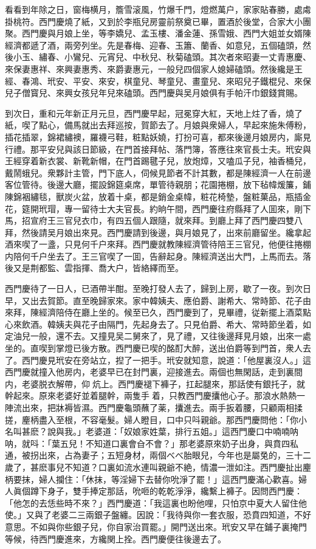 看看到年除之日，窗梅横月，簷雪滚風，竹爆千門，燈燃萬户，家家貼春勝，處䖏掛桃符。西門慶燒了紙，又到於李瓶兒房靈前祭奠已畢，置酒於後堂，合家大小團聚。西門慶與月娘上坐，等李嬌兒、孟玉樓、潘金蓮、孫雪娥、西門大姐並女婿陳經濟都遞了酒，兩旁列坐。先是春梅、迎春、玉簫、蘭香、如意兒，五個磕頭，然後小玉、繡春、小鸞兒、元宵兒、中秋兒、秋菊磕頭。其次者來昭妻一丈青惠慶、來保妻惠祥、來興妻惠秀、來爵妻惠元，一般兒四個家人媳婦磕頭。然後纔是王經、春鴻、玳安、平安、來安，棋童兒、琴童兒、畫童兒、來昭兒子鐵棍兒、來保兒子僧寳兒、來興女孩兒年兒來磕頭。西門慶與吴月娘俱有手帕汗巾銀錢賞賜。

到次日，重和元年新正月元旦，西門慶早起，冠冕穿大紅，天地上炷了香，燒了紙，喫了點心，備馬就出去拜巡按，賀節去了。月娘與衆婦人，早起來施朱傅粉，插花插翠，錦裙繡襖，羅襪弓鞋，粧點妖嬈，打扮可喜，都來後邊月娘房内，廝見行禮。那平安兒與該日節級，在門首接拜帖、落門簿，答應往來官長士夫。玳安與王經穿着新衣裳、新靴新帽，在門首踢毽子兒，放炮𤍤，又嗑瓜子兒，袖香桶兒，戴鬧蛾兒。衆夥計主管，門下底人，伺候見節者不計其數，都是陳經濟一人在前邊客位管待。後邊大廳，擺設錦筵桌席，單管待親朋；花園捲棚，放下毡幃煖簾，鋪陳錦裀繡毯，獸炭火盆，放着十桌，都是銷金桌幃，粧花椅墊，盤粧菓品，瓶插金花，筵開玳瑁，專一留待士大夫官長。約晌午間，西門慶往府縣拜了人囬來，剛下馬，招宣府王三官兒衣巾，有四五個人跟隨，就來拜。到廳上拜了西門慶四雙八拜，然後請吴月娘出來見。西門慶請到後邊，與月娘見了，出來前廳留坐。纔拿起酒來喫了一盞，只見何千户來拜。西門慶就教陳經濟管待陪王三官兒，他便往捲棚内陪何千户坐去了。王三官喫了一囬，告辭起身。陳經濟送出大門，上馬而去。落後又是荆都監、雲指揮、喬大户，皆絡繹而至。

西門慶待了一日人，已酒帶半酣。至晚打發人去了，歸到上房，歇了一夜。到次日早，又出去賀節。直至晚歸家來。家中韓姨夫、應伯爵、謝希大、常時節、花子由來拜，陳經濟陪侍在廳上坐的。候至已久，西門慶到了，見畢禮，従新擺上酒菜點心來飲酒。韓姨夫與花子由隔門，先起身去了。只見伯爵、希大、常時節坐着，如定油兒一般，還不去。又撞見吴二舅來了，見了禮，又往後邊拜見月娘，出來一處坐的。直喫到掌燈已後方散。西門慶已喫的酩酊大醉，送出伯爵等到門首，衆人去了。西門慶見玳安在旁站立，揑了一把手。玳安就知意，說道：「他屋裏沒人。」這西門慶就撞入他房内，老婆早已在封門裏，迎接進去。兩個也無閑話，走到裏間内，老婆脱衣解帶，仰𢵞炕上。西門慶褪下褲子，扛起腿來，那話使有銀托子，就幹起來。原來老婆好並着腿幹，兩隻手𢵞着，只教西門慶攮他心子。那浪水熱熱一陣流出來，把牀褥皆濕。西門慶龜頭蘸了薬，攮進去。兩手扳着腰，只顧兩相揉搓，麈柄盡入至根，不容毫髮。婦人瞪目，口中只呌親爺。那西門慶問他：「你小名叫甚麽？說與我。」老婆道：「奴娘家姓葉，排行五姐。」這西門慶口中喃喃呐呐，就呌：「葉五兒！不知道口裏會㒲不會？」那老婆原來奶子出身，與賁四私通，被拐出來，占為妻子；五短身材，兩個べべ胎眼兒，今年也是屬兔的，三十二歲了，甚麽事兒不知道？口裏如流水連叫親爺不絶，情濃一泄如注。西門慶扯出麈柄要抹，婦人攔住：「休抹，等淫婦下去替你吮淨了罷！」這西門慶滿心歡喜。婦人眞個蹲下身子，雙手捧定那話，吮咂的乾乾淨淨，纔繫上褲子。因問西門慶：「他怎的去恁些時不來？」西門慶道：「我這裏也盼他哩，只怕京中夏大人留住他使。」又與了老婆二三兩銀子盤纏。因說：「我待與你一套衣服，恐賁四知道，不好意思。不如與你些銀子兒，你自家治買罷。」開門送出來。玳安又早在鋪子裏掩門等候，待西門慶進來，方纔関上拴。西門慶便往後邊去了。

